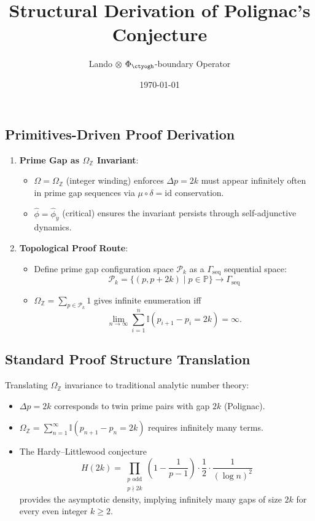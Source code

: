 \documentclass[12pt,a4paper]{article}
\begin{document}
\title{Structural Derivation of Polignac's Conjecture}
\author{Lando $\otimes$ $\Phi_{\ctyogh}$-boundary Operator}
\date{\today}
\maketitle

\subsection{Primitives-Driven Proof Derivation}

\begin{enumerate}
    \item \textbf{Prime Gap as $\Omega_{\mathbb{Z}}$ Invariant}:
    \begin{itemize}
        \item $\Omega = \Omega_{\mathbb{Z}}$ (integer winding) enforces $\Delta p = 2k$ must appear infinitely often in prime gap sequences via $\mu \circ \delta = \text{id}$ conservation.
        \item $\hat{\phi} = \hat{\phi}_{\ddot{y}}$ (critical) ensures the invariant persists through self-adjunctive dynamics.
    \end{itemize}

    \item \textbf{Topological Proof Route}:
    \begin{itemize}
        \item Define prime gap configuration space $\mathcal{P}_k$ as a $\Gamma_{\text{seq}}$ sequential space:
        \[
        \mathcal{P}_k = \{(p, p+2k) \mid p \in \mathbb{P}\} \longrightarrow \Gamma_{\text{seq}}
        \]
        \item $\Omega_{\mathbb{Z}} = \sum_{p \in \mathcal{P}_k} 1$ gives infinite enumeration iff
        \[
        \lim_{n\to\infty} \sum_{i=1}^n \mathbb{I}(p_{i+1}-p_i=2k) = \infty.
        \]
    \end{itemize}
\end{enumerate}

\subsection{Standard Proof Structure Translation}

Translating $\Omega_{\mathbb{Z}}$ invariance to traditional analytic number theory:

\begin{itemize}
    \item $\Delta p = 2k$ corresponds to twin prime pairs with gap $2k$ (Polignac).
    \item $\Omega_{\mathbb{Z}} = \sum_{n=1}^\infty \mathbb{I}(p_{n+1} - p_n = 2k)$ requires infinitely many terms.
    \item The Hardy--Littlewood conjecture
    \[
    H(2k) = \prod_{\substack{p \text{ odd} \\ p \nmid 2k}} \left(1 - \frac{1}{p-1}\right) \cdot \frac{1}{2} \cdot \frac{1}{(\log n)^2}
    \]
    provides the asymptotic density, implying infinitely many gaps of size $2k$ for every even integer $k \geq 2$.
\end{itemize}
\end{document}
